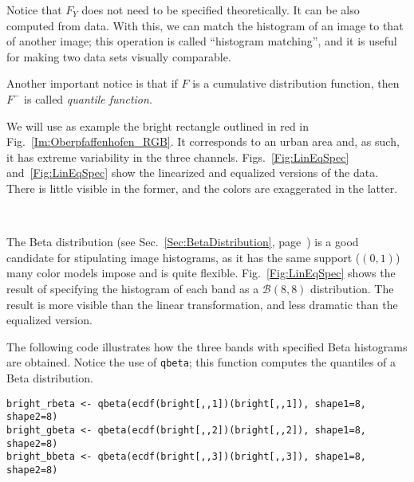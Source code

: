 Notice that $F_Y$ does not need to be specified theoretically.
It can be also computed from data.
With this, we can match the histogram of an image to that of another image;
this operation is called ``histogram matching'', and it is useful for making two data sets visually comparable.

Another important notice is that if $F$ is a cumulative distribution function, then $F^-$ is called \textit{quantile function}.

We will use as example the bright rectangle outlined in red in Fig.~\ref{Im:Oberpfaffenhofen_RGB}.
It corresponds to an urban area and, as such, it has extreme variability in the three channels.
Figs.~\ref{Fig:LinEqSpec} and~\ref{Fig:LinEqSpec} show the linearized and equalized versions of the data.
There is little visible in the former, and the colors are exaggerated in the latter.

\begin{figure*}[hbt]
\centering
{}\ 
\ 
\caption{Examples of linearization, equalization and histogram specification of data from an urban area}\label{Fig:LinEqSpec}
\end{figure*}

The Beta distribution (see Sec.~\ref{Sec:BetaDistribution}, page~\pageref{Sec:BetaDistribution}) is a good candidate for stipulating image histograms, as it has the same support ($(0,1)$) many color models impose and is quite flexible.
Fig.~\ref{Fig:LinEqSpec} shows the result of specifying the histogram of each band as a $\mathcal B(8,8)$ distribution.
The result is more visible than the linear transformation, and less dramatic than the equalized version.

The following code illustrates how the three bands with specified Beta histograms are obtained.
Notice the use of \verb|qbeta|; this function computes the quantiles of a Beta distribution.
\begin{lstlisting}
bright_rbeta <- qbeta(ecdf(bright[,,1])(bright[,,1]), shape1=8, shape2=8)
bright_gbeta <- qbeta(ecdf(bright[,,2])(bright[,,2]), shape1=8, shape2=8)
bright_bbeta <- qbeta(ecdf(bright[,,3])(bright[,,3]), shape1=8, shape2=8)
\end{lstlisting}

